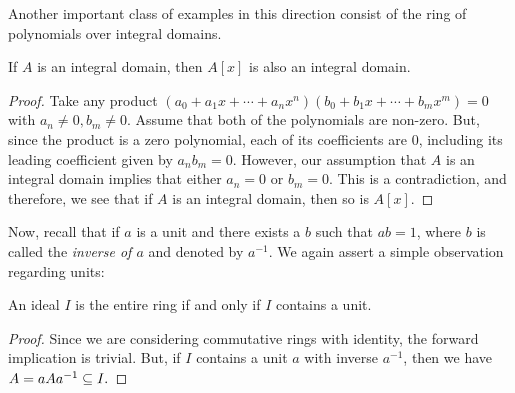 Another important class of examples in this direction consist of the ring of polynomials over integral domains. 
\begin{proposition}\label{prop: poly-integral-domain}
    If $A$ is an integral domain, then $A[x]$ is also an integral domain. 
\end{proposition}
\begin{proof}
     Take any product 
     \(\left(a_{0}+a_{1} x+\cdots+a_{n} x^{n}\right)\left(b_{0}+b_{1} x+\cdots+b_{m} x^{m}\right)=0\)
     with $a_{n} \neq 0, b_{m} \neq 0$. 
     Assume that both of the polynomials are non-zero. But, since the product is a zero polynomial, each of its coefficients are 0, including its leading coefficient given by $a_{n} b_{m}=0$. However, our assumption that $A$ is an integral domain implies that either $a_{n}=0$ or $b_{m}=0$. This is a contradiction, and therefore, we see that if $A$ is an integral domain, then so is $A[x]$.
\end{proof}

Now, recall that if $a$ is a unit and there exists a $b$ such that $a b=1$, where $b$ is called the {\it inverse of $a$} and denoted by $a^{-1}$. We again assert a simple observation regarding units:
\begin{proposition}\label{prop: improper-ideal-unit}
    An ideal $I$ is the entire ring if and only if $I$ contains a unit.
\end{proposition}
\begin{proof}
    Since we are considering commutative rings with identity, the forward implication is trivial. But, if $I$ contains a unit $a$ with inverse $a^{-1}$, then we have 
    \(
    A = aAa^{-1} \ss I.
    \)
\end{proof}

